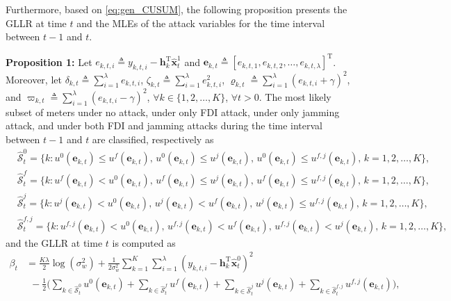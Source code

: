 \documentclass[onecolumn]{IEEEtran}
\begin{document}

Furthermore, based on \eqref{eq:gen_CUSUM}, the following proposition presents the GLLR at time $t$ and the MLEs of the attack variables for the time interval between $t-1$ and $t$.

\textbf{Proposition 1:} Let $e_{k,t,i} \triangleq y_{k,t,i} - \mathbf{h}_k^\mathrm{T} \hat{\mathbf{x}}_t^1$ and $\mathbf{e}_{k,t} \triangleq [e_{k,t,1}, e_{k,t,2}, \dots, e_{k,t,\lambda}]^\mathrm{T}$. Moreover, let $\delta_{k,t} \triangleq \sum_{i=1}^{\lambda} e_{k,t,i}$, $\zeta_{k,t} \triangleq \sum_{i=1}^{\lambda} e_{k,t,i}^2$, $\varrho_{k,t} \triangleq \sum_{i=1}^{\lambda} (e_{k,t,i} + \gamma)^2$, and $\varpi_{k,t} \triangleq \sum_{i=1}^{\lambda} (e_{k,t,i} - \gamma)^2$, $\forall k \in \{1,2,\dots,K\}$, $\forall t > 0$. The most likely subset of meters under no attack, under only FDI attack, under only jamming attack, and under both FDI and jamming attacks during the time interval between $t-1$ and $t$ are classified, respectively as
\begin{align} \label{eq:S0_rrr}
&\hat{\mathcal{S}}_t^0 = \Big\{k: u^0(\mathbf{e}_{k,t}) \leq u^f(\mathbf{e}_{k,t}), \, u^0(\mathbf{e}_{k,t}) \leq u^j(\mathbf{e}_{k,t}), \, u^0(\mathbf{e}_{k,t}) \leq  u^{f,j}(\mathbf{e}_{k,t}), \, k = 1, 2, \dots, K \Big\}, \\ \label{eq:Sf_rrr}
&\hat{\mathcal{S}}_t^f = \Big\{ k: u^f(\mathbf{e}_{k,t}) < u^0(\mathbf{e}_{k,t}), \, u^f(\mathbf{e}_{k,t}) \leq u^j(\mathbf{e}_{k,t}), \, u^f(\mathbf{e}_{k,t}) \leq u^{f,j}(\mathbf{e}_{k,t}), \, k = 1, 2, \dots, K \Big\}, \\ \label{eq:Sj_rrr}
&\hat{\mathcal{S}}_t^j = \Big\{ k: u^j(\mathbf{e}_{k,t}) < u^0(\mathbf{e}_{k,t}), \, u^j(\mathbf{e}_{k,t}) < u^f(\mathbf{e}_{k,t}), \, u^j(\mathbf{e}_{k,t}) \leq u^{f,j}(\mathbf{e}_{k,t}), \, k = 1, 2, \dots, K \Big\}, \\ \label{eq:Sfj_rrr}
&\hat{\mathcal{S}}_t^{f,j} = \Big\{ k: u^{f,j}(\mathbf{e}_{k,t}) < u^0(\mathbf{e}_{k,t}), \, u^{f,j}(\mathbf{e}_{k,t}) < u^f(\mathbf{e}_{k,t}), \, u^{f,j}(\mathbf{e}_{k,t}) < u^j(\mathbf{e}_{k,t}), \, k = 1, 2, \dots, K \Big\},
\end{align}
and the GLLR at time $t$ is computed as
\begin{align} \nonumber
\beta_t &=  \frac{K \lambda}{2} \log(\sigma_w^2) + \frac{1}{2 \sigma_w^2} \sum_{k=1}^{K} \sum_{i=1}^{\lambda} (y_{k,t,i} - \mathbf{h}_k^\mathrm{T} \hat{\mathbf{x}}_t^0)^2 \\ \label{eq:beta_t_v3_rrr}
&~~ - \frac{1}{2} \bigg( \sum_{k \in \hat{\mathcal{S}}_t^0} u^0(\mathbf{e}_{k,t}) + \sum_{k \in \hat{\mathcal{S}}_t^f} u^f(\mathbf{e}_{k,t})
+ \sum_{k \in \hat{\mathcal{S}}_t^j} u^j(\mathbf{e}_{k,t}) + \sum_{k \in \hat{\mathcal{S}}_t^{f,j}} u^{f,j}(\mathbf{e}_{k,t}) \bigg),
\end{align}
\end{document}
